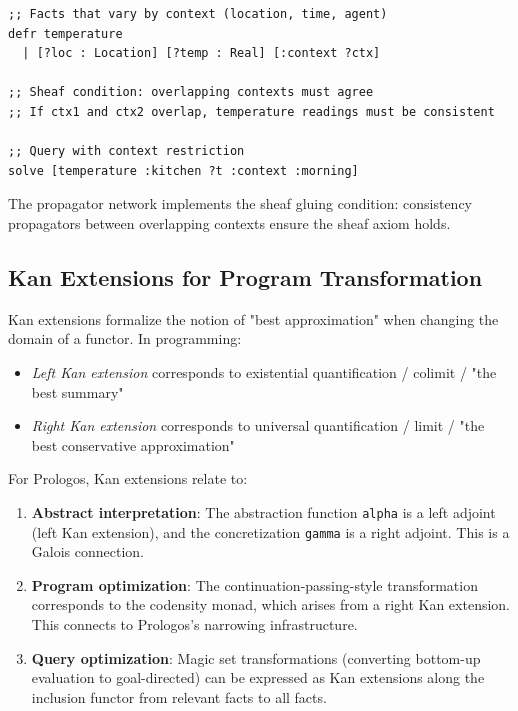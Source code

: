 \documentclass[11pt]{article}
\begin{document}
\begin{verbatim}
;; Facts that vary by context (location, time, agent)
defr temperature
  | [?loc : Location] [?temp : Real] [:context ?ctx]

;; Sheaf condition: overlapping contexts must agree
;; If ctx1 and ctx2 overlap, temperature readings must be consistent

;; Query with context restriction
solve [temperature :kitchen ?t :context :morning]
\end{verbatim}

The propagator network implements the sheaf gluing condition: consistency
propagators between overlapping contexts ensure the sheaf axiom holds.
\subsection{Kan Extensions for Program Transformation}
\label{sec:org741d267}

Kan extensions formalize the notion of "best approximation" when changing
the domain of a functor. In programming:

\begin{itemize}
\item \emph{Left Kan extension} corresponds to existential quantification / colimit /
"the best summary"
\item \emph{Right Kan extension} corresponds to universal quantification / limit /
"the best conservative approximation"
\end{itemize}

For Prologos, Kan extensions relate to:

\begin{enumerate}
\item \textbf{Abstract interpretation}: The abstraction function \texttt{alpha} is a left adjoint
(left Kan extension), and the concretization \texttt{gamma} is a right adjoint.
This is a Galois connection.

\item \textbf{Program optimization}: The continuation-passing-style transformation
corresponds to the codensity monad, which arises from a right Kan extension.
This connects to Prologos's narrowing infrastructure.

\item \textbf{Query optimization}: Magic set transformations (converting bottom-up
evaluation to goal-directed) can be expressed as Kan extensions along
the inclusion functor from relevant facts to all facts.
\end{enumerate}
\end{document}
